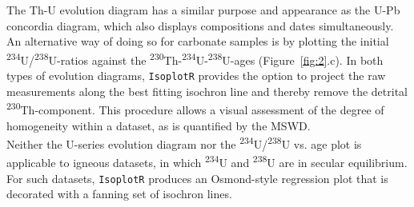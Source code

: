 \begin{refsection}
The Th-U evolution diagram has a similar purpose and appearance as the
U-Pb concordia diagram, which also displays compositions and dates
simultaneously. An alternative way of doing so for carbonate samples
is by plotting the initial
\textsuperscript{234}U/\textsuperscript{238}U-ratios against the
\textsuperscript{230}Th-\textsuperscript{234}U-\textsuperscript{238}U-ages
(Figure~\ref{fig:2}.c).  In both types of evolution diagrams,
\texttt{IsoplotR} provides the option to project the raw measurements
along the best fitting isochron line and thereby remove the detrital
\textsuperscript{230}Th-component. This procedure allows a visual
assessment of the degree of homogeneity within a dataset, as is
quantified by the MSWD.\\

Neither the U-series evolution diagram nor the
\textsuperscript{234}U/\textsuperscript{238}U vs. age plot is
applicable to igneous datasets, in which \textsuperscript{234}U and
\textsuperscript{238}U are in secular equilibrium.  For such datasets,
\texttt{IsoplotR} produces an Osmond-style regression plot that is
decorated with a fanning set of isochron lines.


\printbibliography[heading=subbibliography]

\end{refsection}

